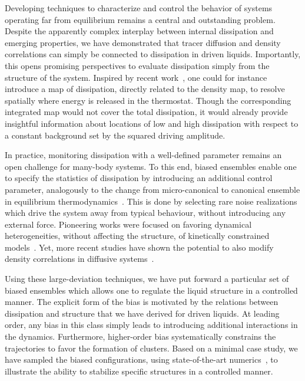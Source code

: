 \documentclass[superscriptaddress, twocolumn, prx, longbibliography, nofootinbib]{revtex4-1}
\begin{document}
Developing techniques to characterize and control the behavior of systems operating far from equilibrium remains a central and outstanding problem. Despite the apparently complex interplay between internal dissipation and emerging properties, we have demonstrated that tracer diffusion and density correlations can simply be connected to dissipation in driven liquids. Importantly, this opens promising perspectives to evaluate dissipation simply from the structure of the system. Inspired by recent work~\cite{Nardini2017}, one could for instance introduce a map of dissipation, directly related to the density map, to resolve spatially where energy is released in the thermostat. Though the corresponding integrated map would not cover the total dissipation, it would already provide insightful information about locations of low and high dissipation with respect to a constant background set by the squared driving amplitude.




In practice, monitoring dissipation with a well-defined parameter remains an open challenge for many-body systems. To this end, biased ensembles enable one to specify the statistics of dissipation by introducing an additional control parameter, analogously to the change from micro-canonical to canonical ensemble in equilibrium thermodynamics~\cite{Chetrite2013, Jack2010}. This is done by selecting rare noise realizations which drive the system away from typical behaviour, without introducing any external force. Pioneering works were focused on favoring dynamical heterogeneities, without affecting the structure, of kinetically constrained models~\cite{garrahan2007, Hedges2009, Pitard2011, Speck2012, Bodineau2012a}. Yet, more recent studies have shown the potential to also modify density correlations in diffusive systems~\cite{Jack2014, Cagnetta2017, nemoto2018optimizing}.


Using these large-deviation techniques, we have put forward a particular set of biased ensembles which allows one to regulate the liquid structure in a controlled manner. The explicit form of the bias is motivated by the relations between dissipation and structure that we have derived for driven liquids. At leading order, any bias in this class simply leads to introducing additional interactions in the dynamics. Furthermore, higher-order bias systematically constrains the trajectories to favor the formation of clusters. Based on a minimal case study, we have sampled the biased configurations, using state-of-the-art numerics~\cite{Giadina2006, tailleur2007probing, Hurtado2009, Nemoto2016, Ray2018, Klymko2018, Brewer2018}, to illustrate the ability to stabilize specific structures in a controlled manner. 
\end{document}
